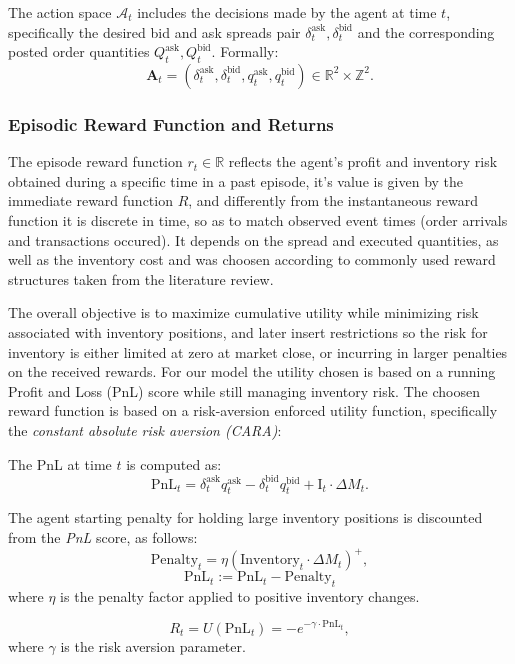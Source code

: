 The action space $\mathcal{A}_t$ includes the decisions made by the agent at time $t$, specifically the desired bid and ask spreads pair $\delta_t^{\text{ask}}, \delta_t^{\text{bid}}$ and the corresponding posted order quantities $Q_t^{\text{ask}}, Q_t^{\text{bid}}$. Formally:
$$
\mathbf{A}_t = \left( \delta_t^{\text{ask}}, \delta_t^{\text{bid}}, q_t^{\text{ask}}, q_t^{\text{bid}} \right) \in \mathbb{R}^2 \times \mathbb{Z}^2.
$$

\subsubsection{Episodic Reward Function and Returns}

The episode reward function $r_t \in \mathbb{R}$ reflects the agent's profit and inventory risk obtained during a specific time in a past episode, it's value is given by the immediate reward function $R$, and differently from the instantaneous reward function it is discrete in time, so as to match observed event times (order arrivals and transactions occured). It depends on the spread and executed quantities, as well as the inventory cost and was choosen according to commonly used reward structures taken from the literature review.

The overall objective is to maximize cumulative utility while minimizing risk associated with inventory positions, and later insert restrictions so the risk for inventory is either limited at zero at market close, or incurring in larger penalties on the received rewards. For our model the utility chosen is based on a running Profit and Loss (PnL) score while still managing inventory risk. The choosen reward function is based on a risk-aversion enforced utility function, specifically the \textit{constant absolute risk aversion (CARA)}:

The PnL at time $t$ is computed as:
$$
\text{PnL}_t = \delta_t^{\text{ask}} q_t^{\text{ask}} - \delta_t^{\text{bid}} q_t^{\text{bid}} + \text{I}_t \cdot \Delta M_t.
$$

The agent starting penalty for holding large inventory positions  is discounted from the \textit{PnL} score, as follows:
$$
\text{Penalty}_t = \eta \left( \text{Inventory}_t \cdot \Delta M_t \right)^+,
$$
$$
\text{PnL}_t := \text{PnL}_t - \text{Penalty}_t
$$
where \( \eta \) is the penalty factor applied to positive inventory changes.

$$
R_t = U(\text{PnL}_t) = -e^{-\gamma \cdot \text{PnL}_t},
$$
where \( \gamma \) is the risk aversion parameter.

